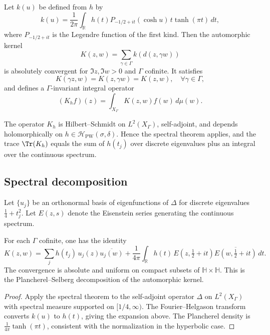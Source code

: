 \begin{definition}
\label{def:automorphic-kernel}
Let $k(u)$ be defined from $h$ by
\[
k(u) = \frac{1}{2\pi}\int_{\mathbb{R}} h(t) P_{-1/2+it}(\cosh u)\, t\tanh(\pi t)\,dt,
\]
where $P_{-1/2+it}$ is the Legendre function of the first kind.  
Then the automorphic kernel
\[
K(z,w) = \sum_{\gamma\in\Gamma} k(d(z,\gamma w))
\]
is absolutely convergent for $\Im z,\Im w > 0$ and $\Gamma$ cofinite.  
It satisfies
\[
K(\gamma z, w)=K(z,\gamma w)=K(z,w),\quad \forall \gamma\in\Gamma,
\]
and defines a $\Gamma$-invariant integral operator
\[
(K_hf)(z) = \int_{X_\Gamma} K(z,w) f(w)\, d\mu(w).
\]
\end{definition}

\begin{lemma}
\label{lem:selfadjoint}
The operator $K_h$ is Hilbert–Schmidt on $L^2(X_\Gamma)$, self-adjoint, and depends holomorphically on $h\in\mathcal{H}_{\mathrm{PW}}(\sigma,\delta)$.  
Hence the spectral theorem applies, and the trace $\Tr(K_h)$ equals the sum of $h(t_j)$ over discrete eigenvalues plus an integral over the continuous spectrum.
\end{lemma}

\subsection{Spectral decomposition}
\label{subsec:ch4-part1-spectral-dec} \relax

Let $\{u_j\}$ be an orthonormal basis of eigenfunctions of $\Delta$ for discrete eigenvalues $\tfrac{1}{4}+t_j^2$.  
Let $E(z,s)$ denote the Eisenstein series generating the continuous spectrum.

\begin{theorem}
\label{thm:spectral-expansion}
For each $\Gamma$ cofinite, one has the identity
\[
K(z,w)
= \sum_{j} h(t_j)\,u_j(z)\overline{u_j(w)}
+ \frac{1}{4\pi}\int_{\mathbb{R}} h(t)\,E(z,\tfrac{1}{2}+it)\overline{E(w,\tfrac{1}{2}+it)}\,dt.
\]
The convergence is absolute and uniform on compact subsets of $\mathbb{H}\times\mathbb{H}$.  
This is the Plancherel–Selberg decomposition of the automorphic kernel.
\end{theorem}

\begin{proof}\relax
Apply the spectral theorem to the self-adjoint operator $\Delta$ on $L^2(X_\Gamma)$ with spectral measure supported on $[1/4,\infty)$.  
The Fourier–Helgason transform converts $k(u)$ to $h(t)$, giving the expansion above.  
The Plancherel density is $\tfrac{1}{4\pi}\tanh(\pi t)$, consistent with the normalization in the hyperbolic case.
\end{proof}

